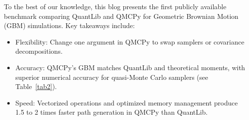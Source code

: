 \bigskip
\begin{tcolorbox}[title=Takeaways,colback=blue!1,colframe=blue!30!black]
To the best of our knowledge, this blog presents the first publicly available
benchmark comparing QuantLib and QMCPy for Geometric Brownian Motion (GBM)
simulations. Key takeaways include:
\begin{itemize}%
    \item Flexibility: Change one argument in QMCPy to swap samplers or
    covariance decompositions.
    \item Accuracy: QMCPy's GBM matches QuantLib and theoretical moments, with
    superior numerical accuracy for quasi-Monte Carlo samplers (see
    Table~\ref{tab2}).
    \item Speed: Vectorized operations and optimized memory management produce
    1.5 to 2 times faster path generation in QMCPy than QuantLib.
\end{itemize}
\end{tcolorbox}







